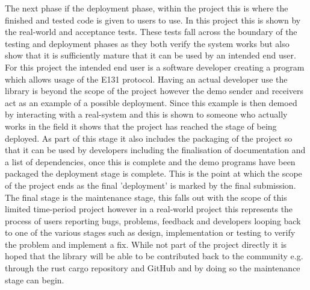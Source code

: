 \documentclass[11pt,a4paper]{article}
\begin{document}
The next phase if the deployment phase, within the project this is where the finished and tested code is given to users to use. In this project this is shown by the real-world and acceptance tests. These tests fall across the boundary of the testing and deployment phases as they both verify the system works but also show that it is sufficiently mature that it can be used by an intended end user. For this project the intended end user is a software developer creating a program which allows usage of the E131 protocol. Having an actual developer use the library is beyond the scope of the project however the demo sender and receivers act as an example of a possible deployment. Since this example is then demoed by interacting with a real-system and this is shown to someone who actually works in the field it shows that the project has reached the stage of being deployed. As part of this stage it also includes the packaging of the project so that it can be used by developers including the finalisation of documentation and a list of dependencies, once this is complete and the demo programs have been packaged the deployment stage is complete. This is the point at which the scope of the project ends as the final 'deployment' is marked by the final submission.\\

The final stage is the maintenance stage, this falls out with the scope of this limited time-period project however in a real-world project this represents the process of users reporting bugs, problems, feedback and developers looping back to one of the various stages such as design, implementation or testing to verify the problem and implement a fix. While not part of the project directly it is hoped that the library will be able to be contributed back to the community e.g. through the rust cargo repository and GitHub and by doing so the maintenance stage can begin. \\
\end{document}
